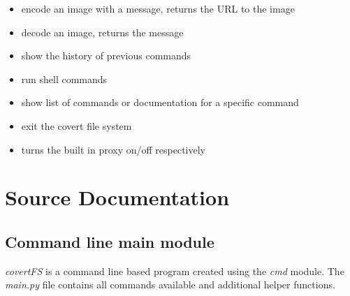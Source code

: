 \documentclass[letterpaper,10pt,english]{sphinxmanual}
\begin{document}
\begin{itemize}
\item {} 
 encode an image with a message, returns the URL to the image

\item {} 
 decode an image, returns the message

\item {} 
 show the history of previous commands

\item {} 
 run shell commands

\item {} 
 \footnotemark[1] show list of commands or documentation for a specific command

\item {} 
 exit the covert file system

\item {} 
 turns the built in proxy on/off respectively

\end{itemize}


\chapter{Source Documentation}
\label{index:source-documentation}

\section{Command line main module}
\label{main::doc}\label{main:command-line-main-module}
\emph{covertFS} is a command line based program created using the \emph{cmd} module. The \emph{main.py} file contains all commands available and additional helper functions.
\label{main:module-main}
\end{document}
